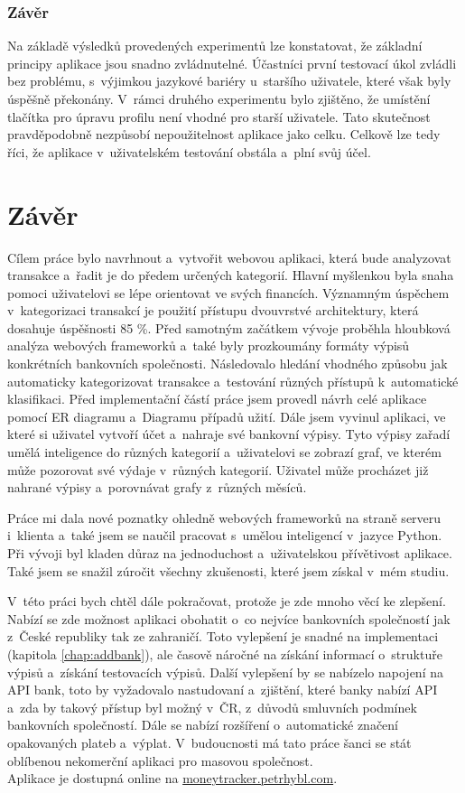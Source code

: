 \subsection{Závěr}
Na základě výsledků provedených experimentů lze konstatovat, že základní principy aplikace jsou snadno zvládnutelné. Účastníci první testovací úkol zvládli bez problému, s~výjimkou jazykové bariéry u~staršího uživatele, které však byly úspěšně překonány. V~rámci druhého experimentu bylo zjištěno, že umístění tlačítka pro úpravu profilu není vhodné pro starší uživatele. Tato skutečnost pravděpodobně nezpůsobí nepoužitelnost aplikace jako celku. Celkově lze tedy říci, že aplikace v~uživatelském testování obstála a~plní svůj účel.
\chapter{Závěr}
Cílem práce bylo navrhnout a~vytvořit webovou aplikaci, která bude analyzovat transakce a~řadit je do předem určených kategorií. Hlavní myšlenkou byla snaha pomoci uživatelovi se lépe orientovat ve svých financích. Významným úspěchem v~kategorizaci transakcí je použití přístupu dvouvrstvé architektury, která dosahuje úspěšnosti 85 \%. Před samotným začátkem vývoje proběhla hloubková analýza webových frameworků a~také byly prozkoumány formáty výpisů konkrétních bankovních společnosti. Následovalo hledání vhodného způsobu jak automaticky kategorizovat transakce a~testování různých přístupů k~automatické klasifikaci. Před implementační částí práce jsem provedl návrh celé aplikace pomocí ER diagramu a~Diagramu případů užití. Dále jsem vyvinul aplikaci, ve které si uživatel vytvoří účet a~nahraje své bankovní výpisy. Tyto výpisy zařadí umělá inteligence do různých kategorií a~uživatelovi se zobrazí graf, ve kterém může pozorovat své výdaje v~různých kategorií. Uživatel může procházet již nahrané výpisy a~porovnávat grafy z~různých měsíců.

Práce mi dala nové poznatky ohledně webových frameworků na straně serveru i~klienta a~také jsem se naučil pracovat s~umělou inteligencí v~jazyce Python. Při vývoji byl kladen důraz na jednoduchost a~uživatelskou přívětivost aplikace. Také jsem se snažil zúročit všechny zkušenosti, které jsem získal v~mém studiu.

V~této práci bych chtěl dále pokračovat, protože je zde mnoho věcí ke zlepšení. Nabízí se zde možnost aplikaci obohatit o~co nejvíce bankovních společností jak z~České republiky tak ze zahraničí. Toto vylepšení je snadné na implementaci (kapitola \ref{chap:addbank}), ale časově náročné na získání informací o~struktuře výpisů a~získání testovacích výpisů. Další vylepšení by se nabízelo napojení na API bank, toto by vyžadovalo nastudovaní a~zjištění, které banky nabízí API a~zda by takový přístup byl možný v~ČR, z~důvodů smluvních podmínek bankovních společností. Dále se nabízí rozšíření o~automatické značení opakovaných plateb a~výplat. V~budoucnosti má tato práce šanci se stát oblíbenou nekomerční aplikaci pro masovou společnost. 
\\
Aplikace je dostupná online na \url{moneytracker.petrhybl.com}.